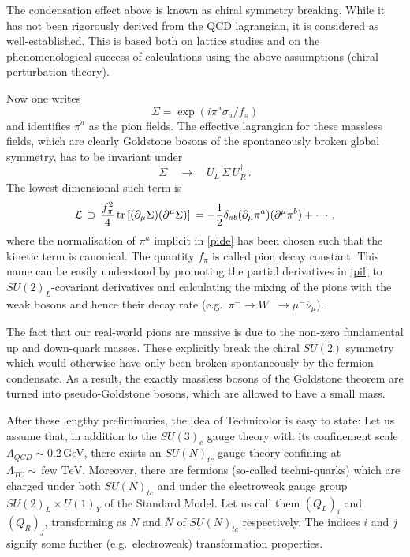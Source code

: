 \documentclass[12pt]{article}
\newcommand{\be}{\begin{equation}}
\newcommand{\ee}{\end{equation}}
\newcommand{\ol}{\overline}
\numberwithin{equation}{section}
\begin{document}
The condensation effect above is known as chiral symmetry breaking. While it has not been rigorously derived from the QCD lagrangian, it is considered as well-established. This is based both on lattice studies and on the phenomenological success of calculations using the above assumptions (chiral perturbation theory).

Now one writes
\be
\Sigma=\exp(i\pi^a\sigma_a/f_\pi) \label{pide}
\ee
and identifies $\pi^a$ as the pion fields. The effective lagrangian for these massless fields, which are clearly Goldstone bosons of the spontaneously broken global symmetry, has to be invariant under
\be
\Sigma\quad\to\quad U_L\,\Sigma\, U_R^\dagger\,.
\ee
The lowest-dimensional such term is 
\be
{\cal L}\,\supset\,\frac{f_\pi^2}{4}\,\mbox{tr}\,[(\partial_\mu \Sigma) (\partial^\mu \Sigma)]\,=-\frac{1}{2}\delta_{ab}(\partial_\mu \pi^a)(\partial^\mu\pi^b)+\cdots\,, \label{pil}
\ee
where the normalisation of $\pi^a$ implicit in \eqref{pide} has been chosen such that the kinetic term is canonical.
The quantity $f_\pi$ is called pion decay constant. This name can be easily understood by promoting the partial derivatives in \eqref{pil} to $SU(2)_L$-covariant derivatives and calculating the mixing of the pions with the weak bosons and hence their decay rate (e.g.~$\pi^-\to W^-\to \mu^-\ol{\nu}_\mu$).

The fact that our real-world pions are massive is due to the non-zero fundamental up and down-quark masses. These explicitly break the chiral $SU(2)$ symmetry which would otherwise have only been broken spontaneously by the fermion condensate. As a result, the exactly massless  bosons of the Goldstone theorem are turned into pseudo-Goldstone bosons, which are allowed to have a small mass.

After these lengthy preliminaries, the idea of Technicolor is easy to state: Let us assume that, in addition to the $SU(3)_c$ gauge theory with its confinement scale $\Lambda_{QCD}\sim 0.2\,$GeV, there exists an $SU(N)_{tc}$ gauge theory confining at $\Lambda_{TC}\sim\,\mbox{few~TeV}$. Moreover, there are fermions (so-called techni-quarks) which are charged under both $SU(N)_{tc}$ and under the electroweak gauge group $SU(2)_L\times U(1)_Y$ of the Standard Model. Let us call them $(Q_L)_i$ and $(Q_R)_j$, transforming as $N$ and $\ol{N}$ of $SU(N)_{tc}$ respectively. The indices $i$ and $j$ signify some further (e.g.~electroweak) transformation properties.
\end{document}
